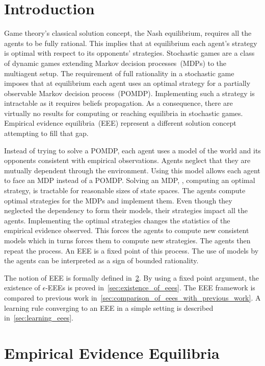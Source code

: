 \section{Introduction}


Game theory's classical solution concept, the Nash equilibrium, requires all the agents to be fully rational.
This implies that at equilibrium each agent's strategy is optimal with respect to its opponents' strategies.
Stochastic games are a class of dynamic games extending Markov decision processes~(MDPs) to the multiagent setup.
The requirement of full rationality in a stochastic game imposes that at equilibrium each agent uses an optimal strategy for a partially observable Markov decision process~(POMDP).
Implementing such a strategy is intractable as it requires beliefs propagation.
As a consequence, there are virtually no results for computing or reaching equilibria in stochastic games.
Empirical evidence equilibria~(EEE) represent a different solution concept attempting to fill that gap.

Instead of trying to solve a POMDP, each agent uses a model of the world and its opponents consistent with empirical observations.
Agents neglect that they are mutually dependent through the environment.
Using this model allows each agent to face an MDP instead of a POMDP.
Solving an MDP, \ie, computing an optimal strategy, is tractable for reasonable sizes of state spaces.
The agents compute optimal strategies for the MDPs and implement them.
Even though they neglected the dependency to form their models, their strategies impact all the agents.
Implementing the optimal strategies changes the statistics of the empirical evidence observed.
This forces the agents to compute new consistent models which in turns forces them to compute new strategies.
The agents then repeat the process.
An EEE is a fixed point of this process.
The use of models by the agents can be interpreted as a sign of bounded rationality.

The notion of EEE is formally defined in~\cref{sec:empirical_evidence_equilibria}.
By using a fixed point argument, the existence of \(\epsilon\)-EEEs is proved in~\cref{sec:existence_of_eees}.
The EEE framework is compared to previous work in~\cref{sec:comparison_of_eees_with_previous_work}.
A learning rule converging to an EEE in a simple setting is described in~\cref{sec:learning_eees}.


\section{Empirical Evidence Equilibria}
\label{sec:empirical_evidence_equilibria}


